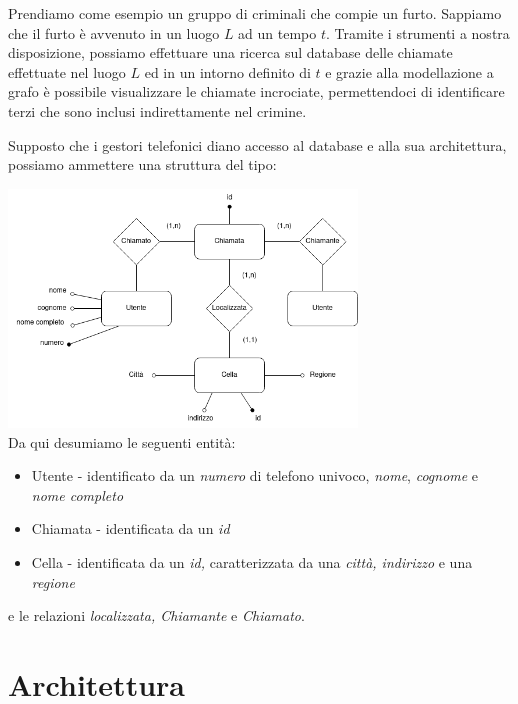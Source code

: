 Prendiamo come esempio un gruppo di criminali che compie un furto. Sappiamo che il furto è avvenuto
in un luogo $L$ ad un tempo $t$. Tramite i strumenti a nostra disposizione, possiamo
effettuare una ricerca sul database delle chiamate effettuate nel luogo $L$ ed in un intorno definito di $t$ e
grazie alla modellazione a grafo è possibile visualizzare le chiamate incrociate, permettendoci di
identificare terzi che sono inclusi indirettamente nel crimine. 

Supposto che i gestori telefonici diano accesso al database e alla sua architettura, possiamo ammettere
una struttura del tipo:

\includegraphics[width=350px, keepaspectratio]{er.png}\\[1cm]

\pagebreak
Da qui desumiamo le seguenti entità:
\begin{itemize}
    \item Utente - identificato da un \textit{numero} di telefono univoco, \textit{nome}, \textit{cognome} e \textit{nome completo}
    \item Chiamata - identificata da un \textit{id}
    \item Cella - identificata da un \textit{id,} caratterizzata da una \textit{città, indirizzo} e una \textit{regione} 
\end{itemize}

e le relazioni \textit{localizzata, Chiamante} e \textit{Chiamato}.

\section{Architettura}

